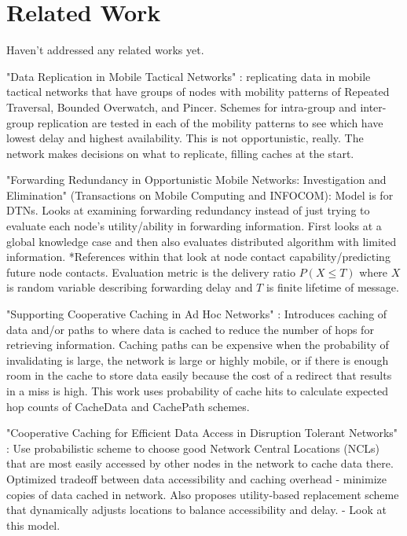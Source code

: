 
\section{Related Work}
\label{sec:related_work}

Haven't addressed any related works yet.

"Data Replication in Mobile Tactical Networks" \cite{data_rep_tact_nets}:  replicating data in mobile tactical networks that have groups of nodes with mobility patterns of Repeated Traversal, Bounded Overwatch, and Pincer.  Schemes for intra-group and inter-group replication are tested in each of the mobility patterns to see which have lowest delay and highest availability.  This is not opportunistic, really.  The network makes decisions on what to replicate, filling caches at the start.

"Forwarding Redundancy in Opportunistic Mobile Networks: Investigation and Elimination" \cite{forw_red_gao2014} (Transactions on Mobile Computing and INFOCOM): Model is for DTNs.  Looks at examining forwarding redundancy instead of just trying to evaluate each node's utility/ability in forwarding information.  First looks at a global knowledge case and then also evaluates distributed algorithm with limited information.  *References within that look at node contact capability/predicting future node contacts.  Evaluation metric is the delivery ratio $P(X \leq T)$ where $X$ is random variable describing forwarding delay and $T$ is finite lifetime of message.

"Supporting Cooperative Caching in Ad Hoc Networks" \cite{coop_cache_TOMC2006}:  Introduces caching of data and/or paths to where data is cached to reduce the number of hops for retrieving information.  Caching paths can be expensive when the probability of invalidating is large, the network is large or highly mobile, or if there is enough room in the cache to store data easily because the cost of a redirect that results in a miss is high.  This work uses probability of cache hits to calculate expected hop counts of CacheData and CachePath schemes.

"Cooperative Caching for Efficient Data Access in Disruption Tolerant Networks" \cite{coop_cache_gao2014}:  Use probabilistic scheme to choose good Network Central Locations (NCLs) that are most easily accessed by other nodes in the network to cache data there.  Optimized tradeoff between data accessibility and caching overhead - minimize copies of data cached in network.  Also proposes utility-based replacement scheme that dynamically adjusts locations to balance accessibility and delay. - Look at this model.

